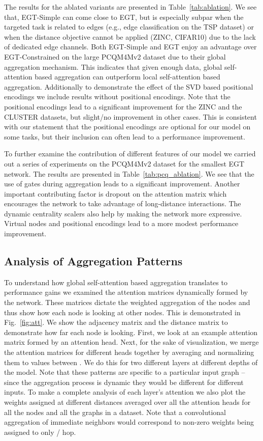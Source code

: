 \documentclass[sigconf,authorversion]{acmart}
\begin{document}
The results for the ablated variants are presented in Table~\ref{tab:ablation}. We see that, EGT-Simple can come close to EGT, but is especially subpar when the targeted task is related to edges (e.g., edge classification on the TSP dataset) or when the distance objective cannot be applied (ZINC, CIFAR10) due to the lack of dedicated edge channels. Both EGT-Simple and EGT enjoy an advantage over EGT-Constrained on the large PCQM4Mv2 dataset due to their global aggregation mechanism. This indicates that given enough data, global self-attention based aggregation can outperform local self-attention based aggregation. Additionally to demonstrate the effect of the SVD based positional encodings we include results without positional encodings. Note that the positional encodings lead to a significant improvement for the ZINC and the CLUSTER datasets, but slight/no improvement in other cases. This is consistent with our statement that the positional encodings are optional for our model on some tasks, but their inclusion can often lead to a performance improvement.

To further examine the contribution of different features of our model we carried out a series of experiments on the PCQM4Mv2 dataset for the smallest EGT network. The results are presented in Table~\ref{tab:pcq_ablation}. We see that the use of gates during aggregation leads to a significant improvement. Another important contributing factor is dropout on the attention matrix which encourages the network to take advantage of long-distance interactions. The dynamic centrality scalers also help by making the network more expressive. Virtual nodes and positional encodings lead to a more modest performance improvement.

\subsection{Analysis of Aggregation Patterns}
To understand how global self-attention based aggregation translates to performance gains we examined the attention matrices dynamically formed by the network. These matrices dictate the weighted aggregation of the nodes and thus show how each node is looking at other nodes. This is demonstrated in Fig.~\ref{fig:att}. We show the adjacency matrix and the distance matrix to demonstrate how far each node is looking. First, we look at an example attention matrix formed by an attention head. Next, for the sake of visualization, we merge the attention matrices for different heads together by averaging and normalizing them to values between . We do this for two different layers at different depths of the model. Note that these patterns are specific to a particular input graph -- since the aggregation process is dynamic they would be different for different inputs. To make a complete analysis of each layer's attention we also plot the weights assigned at different distances averaged over all the attention heads for all the nodes and all the graphs in a dataset. Note that a convolutional aggregation of immediate neighbors would correspond to non-zero weights being assigned to only / hop.
\end{document}

